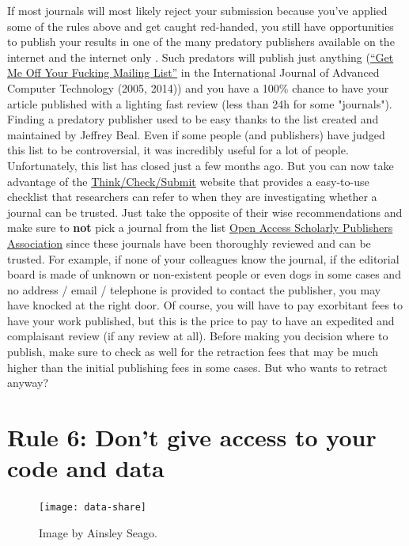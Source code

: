 \documentclass[a4paper,10pt,onecolumn]{article}
\begin{document}
If most journals will most likely reject your submission because you've applied
some of the rules above and get caught red-handed, you still have opportunities
to publish your results in one of the many predatory publishers available on
the internet and the internet only \citep{shen:2015}. Such predators will
publish just anything
(\href{https://en.wikipedia.org/wiki/International_Journal_of_Advanced_Computer_Technology#Publication_controversy}{``Get
  Me Off Your Fucking Mailing List''} in the International Journal of Advanced
Computer Technology (2005, 2014)) and you have a 100\% chance to have your
article published with a lighting fast review (less than 24h for some
"journals"). Finding a predatory publisher used to be easy thanks to the list
created and maintained by Jeffrey Beal. Even if some people (and publishers)
have judged this list to be controversial, it was incredibly useful for a lot
of people. Unfortunately, this list has closed just a few months ago. But you
can now take advantage of the
\href{http://thinkchecksubmit.org}{Think/Check/Submit} website that provides a
easy-to-use checklist that researchers can refer to when they are investigating
whether a journal can be trusted. Just take the opposite of their wise
recommendations and make sure to \textbf{not} pick a journal from the list
\href{https://oaspa.org}{Open Access Scholarly Publishers Association} since
these journals have been thoroughly reviewed and can be trusted. For example,
if none of your colleagues know the journal, if the editorial board is made of
unknown or non-existent people \citep{sorokowski:2017} or even dogs in some
cases \citep{kennedy:2017} and no address / email / telephone is provided to
contact the publisher, you may have knocked at the right door. Of course, you
will have to pay exorbitant fees to have your work published, but this is the
price to pay to have an expedited and complaisant review (if any review at
all). Before making you decision where to publish, make sure to check as well
for the retraction fees that may be much higher than the initial publishing
fees in some cases. But who wants to retract anyway?

\section*{Rule 6: Don't give access to your code and data}

\begin{figure}
  \vspace{-6mm}
  \begin{center}
    \texttt{[image: data-share]}
  \end{center}
  \caption{Image by Ainsley Seago.}
  \label{fig:datasaurus}
\end{figure}
\end{document}
